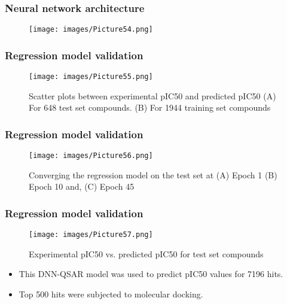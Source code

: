 \documentclass{beamer}
\begin{document}
\begin{frame}
\frametitle{\textbf{Neural network architecture}}
\begin{figure}
\texttt{[image: images/Picture54.png]}
\end{figure}
\end{frame}

\begin{frame}
\frametitle{\textbf{Regression model validation}}
\begin{figure}
\texttt{[image: images/Picture55.png]}
\caption{Scatter plots between experimental pIC50 and predicted pIC50 (A) For 648 test set compounds. (B) For 1944 training set compounds}
\end{figure}
\end{frame}

\begin{frame}
\frametitle{\textbf{Regression model validation}}
\begin{figure}
\texttt{[image: images/Picture56.png]}
\caption{Converging the regression model on the test set at (A) Epoch 1 (B) Epoch 10 and, (C) Epoch 45}
\end{figure}
\end{frame}

\begin{frame}
\frametitle{\textbf{Regression model validation}}
\begin{figure}
\texttt{[image: images/Picture57.png]}
\caption{Experimental pIC50 vs. predicted pIC50 for test set compounds}
\end{figure}
\begin{itemize}
\item This DNN-QSAR model was used to predict pIC50 values for 7196 hits.
\item Top 500 hits were subjected to molecular docking.
\end{itemize}
\end{frame}

\end{document}
